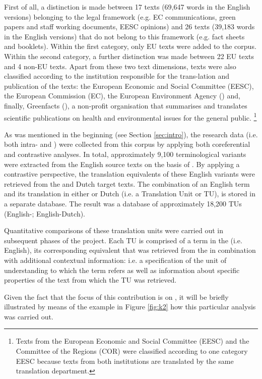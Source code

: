 \documentclass[output=paper]{langsci/langscibook.cls}
\begin{document}
First of all, a distinction is made between 17 texts (69,647 words in the English versions) belonging to the legal framework (e.g. EC communications, green papers and staff working documents, EESC opinions) and 26 texts (39,183 words in the English versions) that do not belong to this framework (e.g. fact sheets and booklets). Within the first category, only EU texts were added to the corpus. Within the second category, a further distinction was made between 22 EU texts and 4 non-EU texts. Apart from these two text dimensions, texts were also classified according to the institution responsible for the trans-lation and publication of the texts: the European Economic and Social Committee (EESC), the European Commission (EC), the European Environment Agency () and, finally, Greenfacts (), a non-profit organisation that summarises and translates scientific publications on health and environmental issues for the general public. \footnote{Texts from the European Economic and Social Committee (EESC) and the Committee of the Regions (COR) were classified according to one category EESC because texts from both institutions are translated by the same translation department.}

As was mentioned in the beginning (see Section \ref{sec:intro}), the research data (i.e. both intra- and ) were collected from this corpus by applying both coreferential and contrastive analyses. In total, approximately 9,100 terminological 
variants were extracted from the English source texts on the basis of . By applying a contrastive perspective, the translation equivalents of these English variants were retrieved from the  and Dutch target texts. The combination of an English term and its translation in either  or Dutch (i.e. a Translation Unit or TU), is stored in a separate database. The result was a database of approximately 18,200 TUs (English-; English-Dutch).

Quantitative comparisons of these translation units were carried out in subsequent phases of the project. Each TU is comprised of a term in the  (i.e. English), its corresponding equivalent that was retrieved from the  in combination with additional contextual information: i.e. a specification of the unit of understanding to which the  term refers as well as information about specific properties of the text from which the TU was retrieved. 

Given the fact that the focus of this contribution is on , it will be briefly illustrated by means of the example in Figure \ref{fig:k2} how this particular analysis was carried out. 
\end{document}
